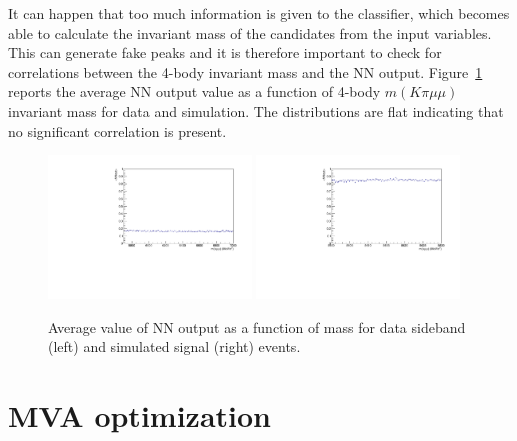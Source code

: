 It can happen that too much information is given to the classifier, which becomes able to 
calculate the invariant mass of the candidates from the input variables.
This can generate fake peaks and it is therefore important to check
for correlations between the 4-body invariant mass and the NN output.
Figure~\ref{fig:Lb_NNprofiles} reports the average NN output value as a function of
4-body $m(K\pi\mu\mu)$ invariant mass for data and simulation. The distributions
are flat indicating that no significant correlation is present.
%
\begin{figure}
\centering
\includegraphics[width=0.48\textwidth]{Lmumu/figs/NNout_profile_vs_LbMM_bkgData.pdf}
\includegraphics[width=0.48\textwidth]{Lmumu/figs/NNout_profile_vs_LbMM_MCsignal.pdf}
\caption{Average value of NN output as a function of \Lb mass for data sideband (left) and simulated signal (right) events.}
\label{fig:Lb_NNprofiles}
\end{figure}








\section{MVA optimization}
\label{sec:Lb_mva_opt}


